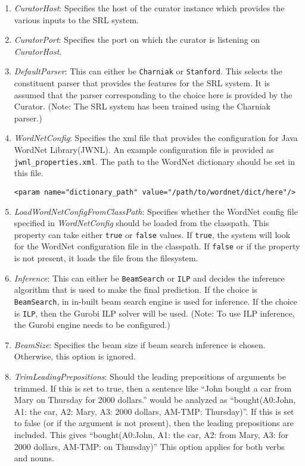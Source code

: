 \documentclass[11pt]{article}
\begin{document}
\begin{enumerate}
\item \emph{CuratorHost}: Specifies the host of the curator instance which
      provides the various inputs to the SRL system.
\item \emph{CuratorPort}: Specifies the port on which the curator is
      listening on \emph{CuratorHost}.
\item \emph{DefaultParser}: This can either be \texttt{Charniak} or
      \texttt{Stanford}. This selects the constituent parser that provides
      the features for the SRL system. It is assumed that the parser
      corresponding to the choice here is provided by the
      Curator. (Note: The SRL system has been trained using the
      Charniak parser.)
\item \emph{WordNetConfig}: Specifies the xml file that provides the
      configuration for Java WordNet Library(JWNL). An example
      configuration file is provided as \texttt{jwnl\_properties.xml}. The
      path to the WordNet dictionary should be set in this file. 
\begin{verbatim}
<param name="dictionary_path" value="/path/to/wordnet/dict/here"/>
\end{verbatim}
\item \emph{LoadWordNetConfigFromClassPath}: Specifies whether the WordNet
      config file specified in \emph{WordNetConfig} should be loaded from
      the classpath. This property can take either \texttt{true} or \texttt{false}
      values. If \texttt{true}, the system will look for the WordNet
      configuration file in the classpath. If \texttt{false} or if the
      property is not present, it loads the file from the filesystem.
\item \emph{Inference}: This can either be \texttt{BeamSearch} or \texttt{ILP} and decides
      the inference algorithm that is used to make the final
      prediction. If the choice is \texttt{BeamSearch}, in in-built beam
      search engine is used for inference. If the choice is \texttt{ILP},
      then the Gurobi ILP solver will be used. (Note: To use ILP
      inference, the Gurobi engine needs to be configured.)
\item \emph{BeamSize}: Specifies the beam size if beam search inference is
      chosen. Otherwise, this option is ignored.
\item \emph{TrimLeadingPrepositions}: Should the leading prepositions of
      arguments be trimmed. If this is set to true, then a sentence
      like ``John bought a car from Mary on Thursday for 2000 dollars.''
      would be analyzed as ``bought(A0:John, A1: the car, A2: Mary, A3:
      2000 dollars, AM-TMP: Thursday)''. If this is set to false (or if
      the argument is not present), then the leading prepositions are
      included. This gives ``bought(A0:John, A1: the car, A2: from
      Mary, A3: for 2000 dollars, AM-TMP: on Thursday)'' This option
      applies for both verbs and nouns.
\end{enumerate}
\end{document}
